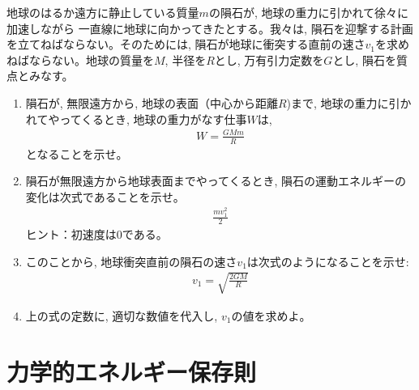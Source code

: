 %
\begin{q}\label{q:meteorite}
地球のはるか遠方に静止している質量$m$の隕石が, 地球の重力に引かれて徐々に加速しながら
一直線に地球に向かってきたとする。我々は, 隕石を迎撃する計画を立てねばならない。そのためには, 
隕石が地球に衝突する直前の速さ$v_1$を求めねばならない。地球の質量を$M$, 半径を$R$とし, 
万有引力定数を$G$とし, 隕石を質点とみなす。
\begin{enumerate}
\item 隕石が, 無限遠方から, 地球の表面（中心から距離$R$)まで, 地球の重力に引かれてやってくるとき, 
地球の重力がなす仕事$W$は, 
\begin{eqnarray}
W=\frac{GMm}{R}\label{eq:meteorite1}
\end{eqnarray}
となることを示せ。
\item 隕石が無限遠方から地球表面までやってくるとき, 隕石の運動エネルギーの変化は次式であることを示せ。
\begin{eqnarray}
\frac{mv_1^2}{2}\label{eq:meteorite2}
\end{eqnarray}
ヒント：初速度は0である。
\item このことから, 地球衝突直前の隕石の速さ$v_1$は次式のようになることを示せ:
\begin{eqnarray}v_1=\sqrt{\frac{2GM}{R}}\end{eqnarray}
\item 上の式の定数に, 適切な数値を代入し, $v_1$の値を求めよ。
\end{enumerate}
\end{q}
\hv



\section{力学的エネルギー保存則}

